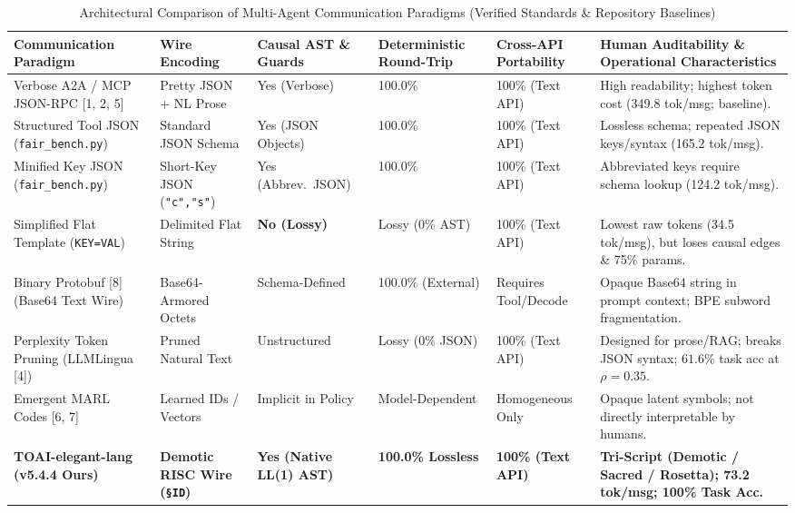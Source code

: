 \documentclass[9pt,a4paper]{extarticle}
\begin{document}
\begin{table}[h!]
\centering
\caption{Architectural Comparison of Multi-Agent Communication Paradigms (Verified Standards \& Repository Baselines)}
\label{tab:arch_comparison}
\footnotesize
\renewcommand{\arraystretch}{0.98}
\setlength{\tabcolsep}{2.5pt}
\begin{tabularx}{\textwidth}{L{3.1cm} L{2.2cm} C{1.8cm} C{1.9cm} C{1.9cm} Y}
\toprule
{}
\textbf{\color{white}Communication Paradigm} &
\textbf{\color{white}Wire Encoding} &
\textbf{\color{white}Causal AST \& Guards} &
\textbf{\color{white}Deterministic Round-Trip} &
\textbf{\color{white}Cross-API Portability} &
\textbf{\color{white}Human Auditability \& Operational Characteristics} \\
\midrule
Verbose A2A / MCP JSON-RPC [1, 2, 5] & Pretty JSON + NL Prose & Yes (Verbose) & 100.0\% & 100\% (Text API) & High readability; highest token cost (349.8 tok/msg; baseline). \\
Structured Tool JSON (\texttt{fair\_bench.py}) & Standard JSON Schema & Yes (JSON Objects) & 100.0\% & 100\% (Text API) & Lossless schema; repeated JSON keys/syntax (165.2 tok/msg). \\
Minified Key JSON (\texttt{fair\_bench.py}) & Short-Key JSON (\texttt{"c","s"}) & Yes (Abbrev.\ JSON) & 100.0\% & 100\% (Text API) & Abbreviated keys require schema lookup (124.2 tok/msg). \\
Simplified Flat Template (\texttt{KEY=VAL}) & Delimited Flat String & \textbf{No (Lossy)} & Lossy (0\% AST) & 100\% (Text API) & Lowest raw tokens (34.5 tok/msg), but loses causal edges \& 75\% params. \\
Binary Protobuf [8] (Base64 Text Wire) & Base64-Armored Octets & Schema-Defined & 100.0\% (External) & Requires Tool/Decode & Opaque Base64 string in prompt context; BPE subword fragmentation. \\
Perplexity Token Pruning (LLMLingua [4]) & Pruned Natural Text & Unstructured & Lossy ($0\%$ JSON) & 100\% (Text API) & Designed for prose/RAG; breaks JSON syntax; $61.6\%$ task acc at $\rho=0.35$. \\
Emergent MARL Codes [6, 7] & Learned IDs / Vectors & Implicit in Policy & Model-Dependent & Homogeneous Only & Opaque latent symbols; not directly interpretable by humans. \\
\textbf{TOAI-elegant-lang (v5.4.4 Ours)} & \textbf{Demotic RISC Wire (\texttt{\S ID})} & \textbf{Yes (Native LL(1) AST)} & \textbf{100.0\% Lossless} & \textbf{100\% (Text API)} & \textbf{Tri-Script (Demotic / Sacred / Rosetta); 73.2 tok/msg; 100\% Task Acc.} \\
\bottomrule
\end{tabularx}
\end{table}
\end{document}
